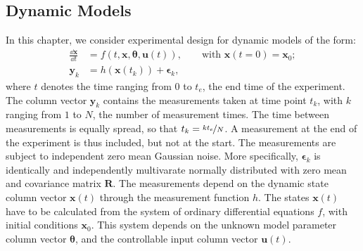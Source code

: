 \subsection{Dynamic Models}
In this chapter, we consider experimental design for dynamic models of the form:
\begin{equation}
\label{systemP2}
\begin{aligned}
\frac{\dd \bm x}{\dd t} &= f(t,\bm x,\bm \theta,\bm u(t)), \qquad \text{with } \bm x(t=0) = \bm x_0;\\
\bm y_k &= h(\bm x(t_k)) + \bm \epsilon_k,
\end{aligned}
\end{equation}
where $t$ denotes the time ranging from $0$ to $t_e$, the end time of the experiment. The column vector $\bm y_k$ contains the measurements taken at time point $t_k$, with $k$ ranging from $1$ to $N$, the number of measurement times. The time between measurements is equally spread, so that $t_k = \nicefrac{kt_e}{N}$. A measurement at the end of the experiment is thus included, but not at the start. The measurements are subject to independent zero mean Gaussian noise. More specifically,  $\bm \epsilon_k$ is identically and independently multivarate normally distributed with zero mean and covariance matrix $\bm R$. The measurements depend on the dynamic state column vector $ \bm x(t)$ through the measurement function $h$. The states $\bm x(t)$ have to be calculated from the system of ordinary differential equations $f$, with initial conditions $\bm x_0$. This system depends on the unknown model parameter column vector $\bm \theta$, and the controllable input column vector $\bm u(t)$.
